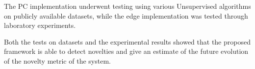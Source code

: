 The PC implementation underwent testing using various Unsupervised algorithms on publicly available datasets, while the edge implementation was tested through laboratory experiments.

Both the tests on datasets and the experimental results showed that the proposed framework is able to detect novelties and give an estimate of the future evolution of the novelty metric of the system.